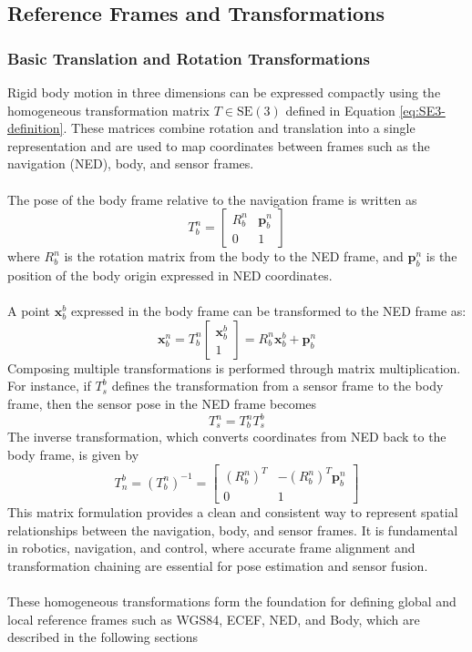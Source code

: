 \subsection{Reference Frames and Transformations}
\subsubsection{Basic Translation and Rotation Transformations}
Rigid body motion in three dimensions can be expressed compactly using the homogeneous transformation matrix $T \in \mathrm{SE}(3)$ defined in Equation \ref{eq:SE3-definition}. These matrices combine rotation and translation into a single representation and are used to map coordinates between frames such as the navigation (NED), body, and sensor frames.  
\\ \\
The pose of the body frame relative to the navigation frame is written as
$$
    T_{b}^{n} =
    \begin{bmatrix}
        R_{b}^{n} & \mathbf{p}_{b}^{n} \\
        0 & 1
    \end{bmatrix}
$$
where $R_{b}^{n}$ is the rotation matrix from the body to the NED frame, and $\mathbf{p}_{b}^{n}$ is the position of the body origin expressed in NED coordinates.
\\ \\
A point $\mathbf{x}_{b}^{b}$ expressed in the body frame can be transformed to the NED frame as:
$$
    \mathbf{x}_{b}^{n}=
    T_{b}^{n}
    \begin{bmatrix}
        \mathbf{x}_{b}^{b} \\ 1
    \end{bmatrix}
    = R_{b}^{n}\mathbf{x}_{b}^{b} + \mathbf{p}_{b}^{n}
$$
\noindent
Composing multiple transformations is performed through matrix multiplication. For instance, if $T_{s}^{b}$ defines the transformation from a sensor frame to the body frame, then the sensor pose in the NED frame becomes
$$
    T_{s}^{n} = T_{b}^{n} T_{s}^{b}
$$
The inverse transformation, which converts coordinates from NED back to the body frame, is given by
$$
    T_{n}^{b} = (T_{b}^{n})^{-1} =
    \begin{bmatrix}
        (R_{b}^{n})^T & -(R_{b}^{n})^T \mathbf{p}_{b}^{n} \\
        0 & 1
    \end{bmatrix}
$$
This matrix formulation provides a clean and consistent way to represent spatial relationships between the navigation, body, and sensor frames. It is fundamental in robotics, navigation, and control, where accurate frame alignment and transformation chaining are essential for pose estimation and sensor fusion.
\\ \\
These homogeneous transformations form the foundation for defining global and local reference frames such as WGS84, ECEF, NED, and Body, which are described in the following sections



